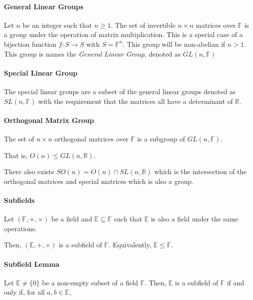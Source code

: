 \paragraph{General Linear Groups}
Let \(n\) be an integer such that \(n \geq 1\). The set of invertible
\(n\times n\) matrices over \(\mathbb{F}\) is a group under the operation
of matrix multiplication.
This is a special case of a bijection function \(f: S\to S\) with
\(S = \mathbb{F}^n\). This group will be non-abelian if \(n > 1\).
This group is names the \textit{General Linear Group}, denoted as
\(GL(n, \mathbb{F})\)

\paragraph{Special Linear Group}
The special linear groups are a subset of the general linear groups
denoted as \(SL(n, \mathbb{F})\) with the requirement that the matrices
all have a determinant of \(\mathbb{R}\).

\paragraph{Orthogonal Matrix Group}
The set of \(n\times n\) orthogonal matrices over \(\mathbb{F}\) is a subgroup of 
\(GL(n, \mathbb{F})\).

That is, \(O(n) \leq GL(n, \mathbb{R})\).

There also exists \(SO(n) = O(n) \cap SL(n, \mathbb{R})\) which is the
intersection of the orthogonal matrices and special matrices which is also
a group.

\paragraph{Subfields}
Let \((\mathbb{F}, +, \times)\) be a field and
\(\mathbb{E}\subseteq \mathbb{F}\) such that \(\mathbb{E}\) is also a
field under the same operations.

Then, \((\mathbb{E}, +, \times)\) is a subfield of \(\mathbb{F}\).
Equivalently, \(\mathbb{E}\leq \mathbb{F}\).

\paragraph{Subfield Lemma}
Let \(\mathbb{E} \neq \{0\} \) be a non-empty subset of a field
\(\mathbb{F}\).
Then, \(\mathbb{E}\) is a subfield of \(\mathbb{F}\) if and only if,
for all \(a, b \in \mathbb{E}\),

